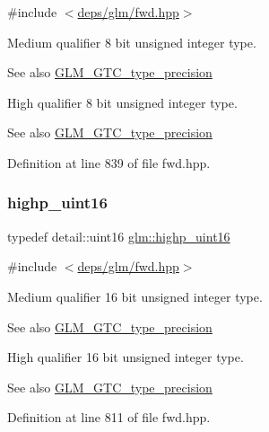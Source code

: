 {\ttfamily \#include $<$\hyperlink{fwd_8hpp}{deps/glm/fwd.\+hpp}$>$}

Medium qualifier 8 bit unsigned integer type. \begin{DoxySeeAlso}{See also}
\hyperlink{group__gtc__type__precision}{G\+L\+M\+\_\+\+G\+T\+C\+\_\+type\+\_\+precision}
\end{DoxySeeAlso}
High qualifier 8 bit unsigned integer type. \begin{DoxySeeAlso}{See also}
\hyperlink{group__gtc__type__precision}{G\+L\+M\+\_\+\+G\+T\+C\+\_\+type\+\_\+precision} 
\end{DoxySeeAlso}


Definition at line 839 of file fwd.\+hpp.

\mbox{\label{group__gtc__type__precision_ga4d32967d45ba8365e2a05eaaac85e978}} 
\subsubsection{\texorpdfstring{highp\+\_\+uint16}{highp\_uint16}}
{\footnotesize\ttfamily typedef detail\+::uint16 \hyperlink{group__gtc__type__precision_ga4d32967d45ba8365e2a05eaaac85e978}{glm\+::highp\+\_\+uint16}}



{\ttfamily \#include $<$\hyperlink{fwd_8hpp}{deps/glm/fwd.\+hpp}$>$}

Medium qualifier 16 bit unsigned integer type. \begin{DoxySeeAlso}{See also}
\hyperlink{group__gtc__type__precision}{G\+L\+M\+\_\+\+G\+T\+C\+\_\+type\+\_\+precision}
\end{DoxySeeAlso}
High qualifier 16 bit unsigned integer type. \begin{DoxySeeAlso}{See also}
\hyperlink{group__gtc__type__precision}{G\+L\+M\+\_\+\+G\+T\+C\+\_\+type\+\_\+precision} 
\end{DoxySeeAlso}


Definition at line 811 of file fwd.\+hpp.

\mbox{\label{group__gtc__type__precision_ga3145bc0ee80432c165e985a188a722b3}} 
